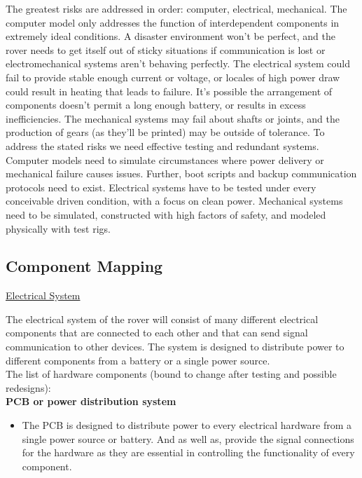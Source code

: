\documentclass[a4paper, 10pt]{article}
\begin{document}
	The greatest risks are addressed in order: computer, electrical, mechanical. The computer model only addresses the function of interdependent components in extremely ideal conditions. A disaster environment won't be perfect, and the rover needs to get itself out of sticky situations if communication is lost or electromechanical systems aren't behaving perfectly. The electrical system could fail to provide stable enough current or voltage, or locales of high power draw could result in heating that leads to failure. It's possible the arrangement of components doesn't permit a long enough battery, or results in excess inefficiencies. The mechanical systems may fail about shafts or joints, and the production of gears (as they'll be printed) may be outside of tolerance.
	To address the stated risks we need effective testing and redundant systems. Computer models need to simulate circumstances where power delivery or mechanical failure causes issues. Further, boot scripts and backup communication protocols need to exist. Electrical systems have to be tested under every conceivable driven condition, with a focus on clean power. Mechanical systems need to be simulated, constructed with high factors of safety, and modeled physically with test rigs.
 	
 	\subsection{Component Mapping}
\underline{Electrical System}
 	
 	The electrical system of the rover will consist of many different electrical components that are connected to each other and that can send signal communication to other devices. The system is designed to distribute power to different components from a battery or a single power source. \\
	
The list of hardware components (bound to change after testing and possible redesigns): \\

\textbf{PCB or power distribution system}

\begin{itemize}
\item
	The PCB is designed to distribute power to every electrical hardware from a single power source or battery. And as well as, provide the signal connections for the hardware as they are essential in controlling the functionality of every component.
\end{itemize}
\end{document}
